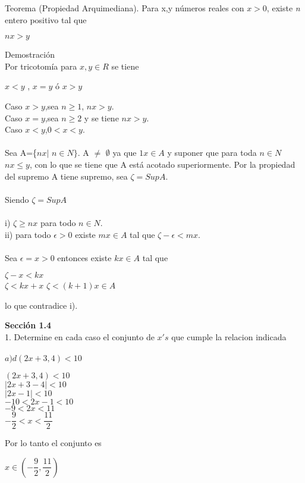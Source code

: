 \documentclass[12pt,a4paper,scrartcl]{article}
\begin{document}
{\newpage
Teorema (Propiedad Arquimediana). Para x,y n\'umeros reales con $x>0$, existe \textit{n} entero positivo tal que
\begin{center}
$nx>y$
\end{center}
Demostraci\'on\\
Por tricotom\'ia para $x,y \in R$ se tiene
\begin{center}
 $ x < y $ , $x = y $ \'o $ x > y $
\end{center}
Caso $x>y$,\hspace{1em}sea $n\geq 1$, $nx > y$.\\
Caso $x=y$,\hspace{1em}sea $n\geq 2$ y se tiene $nx>y$.\\
Caso $x<y$,\hspace{1em}$0<x<y$.\\
\\Sea A=\{$nx \lvert$ $n\in N\}$. A $\neq$ $\emptyset$
ya que $1x\in A$ y suponer que para toda $n\in N$ $nx\leq y$, con lo que se tiene que A est\'a acotado superiormente. Por la propiedad del supremo A tiene supremo, sea $\zeta=SupA.$\\
\\Siendo $\zeta=SupA$\\
\\
i) $\zeta\geq nx$ para todo $ n \in N$.\\
ii) para todo $\epsilon>0$ existe $mx \in A$ tal que $\zeta-\epsilon<mx$.\\
\\Sea $\epsilon=x>0$ entonces existe $kx \in A$ tal que
\begin{center}
$\zeta-x<kx$\\
$\zeta<kx+x$
$\zeta<(k+1)x \in A$\\
\end{center}
lo que contradice i).

\newpage
\textbf{Secci\'on 1.4}\\
1. Determine en cada caso el conjunto de $x's$ que cumple la relacion indicada\\
\\ $a) d(2x+3,4)<10$\\
\begin{center}
$(2x+3,4)<10$\\\vspace{1em}
$\rvert 2x+3-4\rvert<10$\\\vspace{1em}
$\rvert2x-1\rvert<10$\\\vspace{1em}
$-10<2x-1<10$\\\vspace{1em}
$-9<2x<11$\\\vspace{1em}
$-\dfrac{9}{2}<x<\dfrac{11}{2}$
\end{center}
Por lo tanto el conjunto es\\\vspace{1em}
\begin{center}
$x\in (-\dfrac{9}{2},\dfrac{11}{2})$
\end{center}


}
\end{document}
